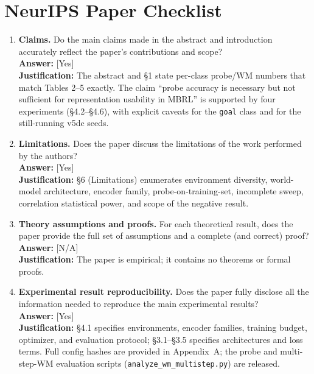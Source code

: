 %

\section*{NeurIPS Paper Checklist}

\begin{enumerate}

  \item \textbf{Claims.} Do the main claims made in the abstract and introduction accurately reflect the paper's contributions and scope?\\
  \textbf{Answer:} [Yes]\\
  \textbf{Justification:} The abstract and \S1 state per-class probe/WM numbers that match Tables 2--5 exactly. The claim ``probe accuracy is necessary but not sufficient for representation usability in MBRL'' is supported by four experiments (\S4.2--\S4.6), with explicit caveats for the \texttt{goal} class and for the still-running v5dc seeds.

  \item \textbf{Limitations.} Does the paper discuss the limitations of the work performed by the authors?\\
  \textbf{Answer:} [Yes]\\
  \textbf{Justification:} \S6 (Limitations) enumerates environment diversity, world-model architecture, encoder family, probe-on-training-set, incomplete sweep, correlation statistical power, and scope of the negative result.

  \item \textbf{Theory assumptions and proofs.} For each theoretical result, does the paper provide the full set of assumptions and a complete (and correct) proof?\\
  \textbf{Answer:} [N/A]\\
  \textbf{Justification:} The paper is empirical; it contains no theorems or formal proofs.

  \item \textbf{Experimental result reproducibility.} Does the paper fully disclose all the information needed to reproduce the main experimental results?\\
  \textbf{Answer:} [Yes]\\
  \textbf{Justification:} \S4.1 specifies environments, encoder families, training budget, optimizer, and evaluation protocol; \S3.1--\S3.5 specifies architectures and loss terms. Full config hashes are provided in Appendix~A; the probe and multi-step-WM evaluation scripts (\texttt{analyze\_wm\_multistep.py}) are released.


\end{enumerate}
